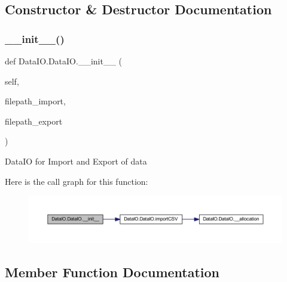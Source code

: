 \subsection{Constructor \& Destructor Documentation}
\mbox{\label{class_data_i_o_1_1_data_i_o_a98bdded980e8bfc4ddaa1cd12a8392fe}} 
\subsubsection{\texorpdfstring{\+\_\+\+\_\+init\+\_\+\+\_\+()}{\_\_init\_\_()}}
{\footnotesize\ttfamily def Data\+I\+O.\+Data\+I\+O.\+\_\+\+\_\+init\+\_\+\+\_\+ (\begin{DoxyParamCaption}\item[{}]{self,  }\item[{}]{filepath\+\_\+import,  }\item[{}]{filepath\+\_\+export }\end{DoxyParamCaption})}

\begin{DoxyVerb}DataIO for Import and Export of data
\end{DoxyVerb}
 Here is the call graph for this function\+:
\nopagebreak
\begin{figure}[H]
\begin{center}
\leavevmode
\includegraphics[width=350pt]{class_data_i_o_1_1_data_i_o_a98bdded980e8bfc4ddaa1cd12a8392fe_cgraph}
\end{center}
\end{figure}


\subsection{Member Function Documentation}
\mbox{\label{class_data_i_o_1_1_data_i_o_a945b9f613d7eb68756a1483c8d8d7419}} 
